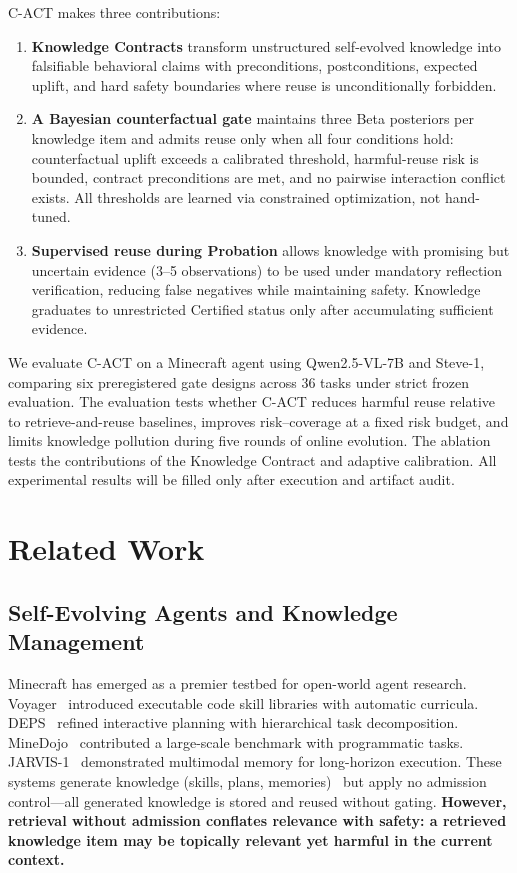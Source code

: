 \documentclass[letterpaper]{article}
\begin{document}
\textsc{C-ACT} makes three contributions:

\begin{enumerate}
    \item \textbf{Knowledge Contracts} transform unstructured self-evolved knowledge into falsifiable behavioral claims with preconditions, postconditions, expected uplift, and hard safety boundaries where reuse is unconditionally forbidden.
    \item \textbf{A Bayesian counterfactual gate} maintains three Beta posteriors per knowledge item and admits reuse only when all four conditions hold: counterfactual uplift exceeds a calibrated threshold, harmful-reuse risk is bounded, contract preconditions are met, and no pairwise interaction conflict exists. All thresholds are learned via constrained optimization, not hand-tuned.
    \item \textbf{Supervised reuse during Probation} allows knowledge with promising but uncertain evidence (3--5 observations) to be used under mandatory reflection verification, reducing false negatives while maintaining safety. Knowledge graduates to unrestricted Certified status only after accumulating sufficient evidence.
\end{enumerate}

We evaluate \textsc{C-ACT} on a Minecraft agent using Qwen2.5-VL-7B and Steve-1, comparing six preregistered gate designs across 36 tasks under strict frozen evaluation. The evaluation tests whether \textsc{C-ACT} reduces harmful reuse relative to retrieve-and-reuse baselines, improves risk--coverage at a fixed risk budget, and limits knowledge pollution during five rounds of online evolution. The ablation tests the contributions of the Knowledge Contract and adaptive calibration. All experimental results will be filled only after execution and artifact audit.

\section{Related Work}

\subsection{Self-Evolving Agents and Knowledge Management}

Minecraft has emerged as a premier testbed for open-world agent research. Voyager~\cite{voyager2023} introduced executable code skill libraries with automatic curricula. DEPS~\cite{deps2023} refined interactive planning with hierarchical task decomposition. MineDojo~\cite{minedojo2022} contributed a large-scale benchmark with programmatic tasks. JARVIS-1~\cite{jarvis2024} demonstrated multimodal memory for long-horizon execution. These systems generate knowledge (skills, plans, memories)~\cite{voyager2023,deps2023,jarvis2024} but apply no admission control---all generated knowledge is stored and reused without gating. \textbf{However, retrieval without admission conflates relevance with safety: a retrieved knowledge item may be topically relevant yet harmful in the current context.}
\end{document}
